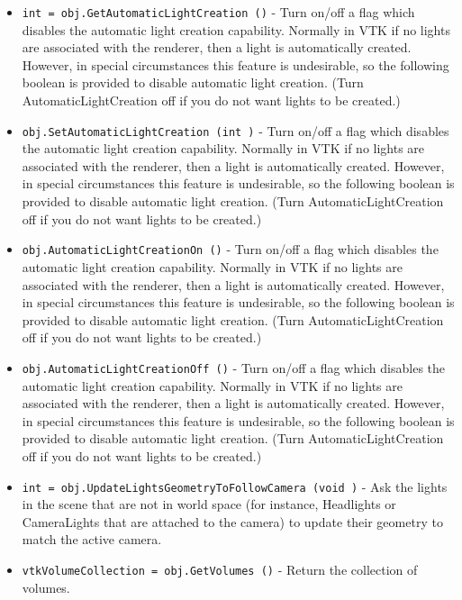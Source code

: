 \begin{itemize}
\item  \verb|int = obj.GetAutomaticLightCreation ()| -  Turn on/off a flag which disables the automatic light creation capability.
 Normally in VTK if no lights are associated with the renderer, then a light
 is automatically created. However, in special circumstances this feature is
 undesirable, so the following boolean is provided to disable automatic
 light creation. (Turn AutomaticLightCreation off if you do not want lights
 to be created.)

\item  \verb|obj.SetAutomaticLightCreation (int )| -  Turn on/off a flag which disables the automatic light creation capability.
 Normally in VTK if no lights are associated with the renderer, then a light
 is automatically created. However, in special circumstances this feature is
 undesirable, so the following boolean is provided to disable automatic
 light creation. (Turn AutomaticLightCreation off if you do not want lights
 to be created.)

\item  \verb|obj.AutomaticLightCreationOn ()| -  Turn on/off a flag which disables the automatic light creation capability.
 Normally in VTK if no lights are associated with the renderer, then a light
 is automatically created. However, in special circumstances this feature is
 undesirable, so the following boolean is provided to disable automatic
 light creation. (Turn AutomaticLightCreation off if you do not want lights
 to be created.)

\item  \verb|obj.AutomaticLightCreationOff ()| -  Turn on/off a flag which disables the automatic light creation capability.
 Normally in VTK if no lights are associated with the renderer, then a light
 is automatically created. However, in special circumstances this feature is
 undesirable, so the following boolean is provided to disable automatic
 light creation. (Turn AutomaticLightCreation off if you do not want lights
 to be created.)

\item  \verb|int = obj.UpdateLightsGeometryToFollowCamera (void )| -  Ask the lights in the scene that are not in world space
 (for instance, Headlights or CameraLights that are attached to the
 camera) to update their geometry to match the active camera.

\item  \verb|vtkVolumeCollection = obj.GetVolumes ()| -  Return the collection of volumes.


\end{itemize}
